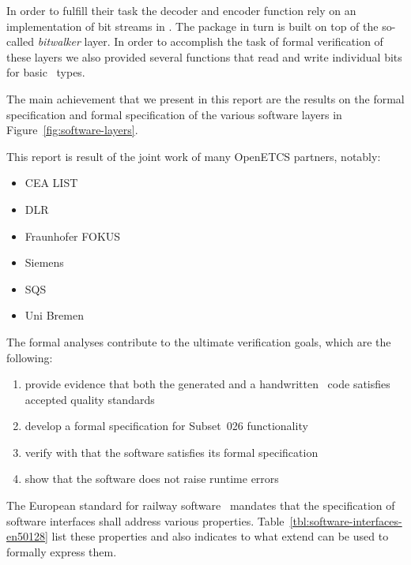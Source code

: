 \FloatBarrier

In order to fulfill their task the decoder and encoder function rely on an
implementation of bit streams in \isoc.
The  package in turn is built on top of the so-called \emph{bitwalker} layer.
In order to accomplish the task of formal verification of these layers 
we also provided several functions that read and write individual bits for basic \isoc~types.

The main achievement that we present in this report are the results
on the formal specification and formal specification of the various software layers 
in Figure~\ref{fig:software-layers}.

This report is result of the joint work of many OpenETCS partners, notably:

\begin{itemize}
\item CEA LIST
\item DLR
\item Fraunhofer FOKUS
\item Siemens
\item SQS
\item Uni Bremen
\end{itemize}

The formal analyses contribute to the ultimate verification goals,
which are the following:

\begin{enumerate}
\item provide evidence that both the generated and a handwritten \isoc~code satisfies 
      accepted quality standards
\item develop a formal specification for Subset~026 functionality
\item verify with \framacwp that the software satisfies its formal specification
\item show that the software does not raise runtime errors
\end{enumerate}

The European standard for railway software~\cite[\S~7.3.4.19]{en50128-2011} mandates that 
the specification of software interfaces shall address various properties.
Table~\ref{tbl:software-interfaces-en50128} list these properties and also indicates
to what extend \framac can be used to formally express them.


